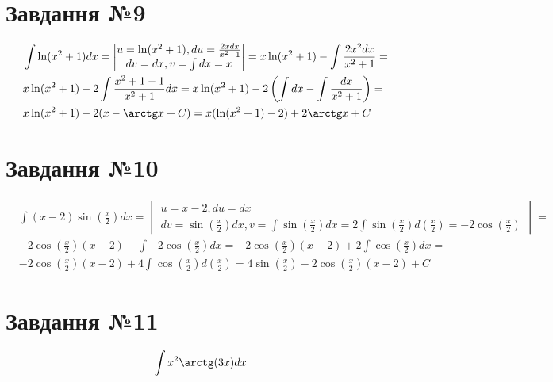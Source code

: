 \documentclass{report}
\begin{document}
\section{Завдання №9}
\begin{equation}\label{eq9}\begin{split}
	& \int\ln(x^2 + 1) dx = \begin{vmatrix}u =\ln(x^2 + 1), du = \frac{2xdx}{x^2 + 1}\\dv=dx, v = \int dx = x\end{vmatrix} = x\ln(x^2 + 1) - \int \frac{2x^2 dx}{x^2 + 1} =\\
	& x\ln(x^2 + 1) - 2\int\frac{x^2 + 1 - 1}{x^2 + 1} dx = x\ln(x^2 + 1) - 2\left(\int dx - \int \frac{dx}{x^2 + 1}\right) =\\
	& x\ln(x^2 + 1) - 2(x - \arctg x + C) = x(\ln(x^2 + 1) - 2) + 2\arctg x + C
\end{split}\end{equation}

\section{Завдання №10}
\begin{equation}\begin{split}
	& \int(x-2)\sin(\frac{x}{2})dx = \begin{vmatrix}u = x - 2, du = dx\\dv = \sin(\frac{x}{2})dx, v = \int \sin(\frac{x}{2})dx = 2\int \sin(\frac{x}{2})d(\frac{x}{2}) = -2\cos(\frac{x}{2})\end{vmatrix} =\\
	& -2\cos(\frac{x}{2})(x - 2) - \int -2\cos(\frac{x}{2})dx = -2\cos(\frac{x}{2})(x - 2) + 2\int\cos(\frac{x}{2})dx =\\
	&  -2\cos(\frac{x}{2})(x - 2) + 4\int\cos(\frac{x}{2})d(\frac{x}{2}) = 4\sin(\frac{x}{2}) - 2\cos(\frac{x}{2})(x - 2) + C
\end{split}\end{equation}

\section{Завдання №11}
\begin{equation}\begin{split}
	& \int x^2 \arctg(3x)dx
\end{split}\end{equation}
\end{document}
